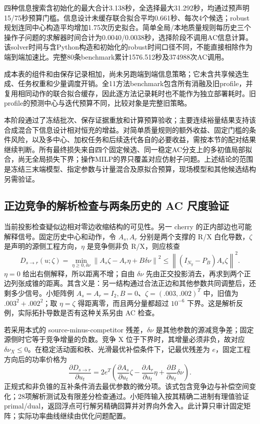 \documentclass[UTF8,fontset=fandol,11pt,a4paper]{ctexart}
\newcommand{\norm}[1]{\left\lVert#1\right\rVert}
\begin{document}
四种信息搜索含初始化的最大合计3.138秒，全选择最大31.292秒，均通过预声明15/75秒预算门槛。信息设计未缓存联合拟合平均0.661秒、每次4个候选；robust规划连同中心构造平均增加1.75次历史拟合。简单全局/本地质量规则每历史三个操作子问题的求解器时间合计为0.0040/0.0038秒，选择阶段不调用AC信息计算。该solver时间与含Python构造和初始化的robust时间口径不同，不能直接相除作为端到端加速比。完整80条benchmark累计1576.512秒及374988次AC调用。

成本表的组件和由保存记录相加，尚未另跑端到端信息策略；它未含共享候选生成、任务权重和少量调度开销。全11方法benchmark包含所有消融及旧profile，并复用相同动作的联合拟合缓存，因此逐方法记录耗时也不能作为独立部署耗时。旧profile的预测中心与迭代预算不同，比较对象是完整旧策略。

本阶段通过了冻结批次、保存证据重放和计算预算验收；主要连续裕量结果支持该合成混合下信息设计相对恒充的增益。对简单质量规则的额外收益、固定门槛的条件风险，以及多中心、加权任务和后续迭代各自的必要收益，需按本节的配对结果继续判断。所有最终损失来自四个固定候选、同一稳定AC分支上的多初值局部拟合，尚无全局损失下界；操作MILP的界只覆盖对应仿射子问题。上述结论的范围是冻结三末端模型、指定参数与计量混合及原拟合预算，现场模型和其他候选结构另需验证。

\subsection{正边竞争的解析检查与两条历史的 AC 尺度验证}
\label{si:pairwise-check}
当前投影检查疑似边相对零边收缩结构的可见性。另一 cherry 的正内部边也可能解释信号。固定历史中心和动作，令 $A_s,A_r$ 分别是两个支撑的 R/X 白化导数，$\zeta$ 是声明的源侧工程方向，$\eta$ 是竞争侧非负 R/X，则应核查
\begin{equation}
 D_{s\to r}(u;\zeta)=\min_{\eta\ge0,\delta\nu}
 \norm{A_s\zeta-A_r\eta+B\delta\nu}^2
 \le \norm{(I_{N_y}-P_B)A_s\zeta}^2.
 \label{si:pairwise-cone}
\end{equation}
$\eta=0$ 给出右侧解释，所以距离不增；自由 $\delta\nu$ 先由正交投影消去，再求到两个正边列张成锥的距离。其含义是：另一结构通过合法正边和其他参数共同调整后，还剩多少信号。小矩阵例 $A_s=A_r=I_2,B=0$、$\zeta=(.003,.002)^T$ 中，旧值为 $.003^2+.002^2$；取 $\eta=\zeta$ 得距离零，而且两分量都超过 $10^{-6}$ 下界。这是解析反例，实际拓扑导数是否有这种关系另由 AC 检查。

若采用本式的 source-minus-competitor 残差，$\delta\nu$ 是其他参数的源减竞争差；固定源侧时它等于竞争增量的负数。竞争 X 位于下界时，其增量必须非负，故对应 $\delta\nu_X\le0$。在稳定活动面和秩、光滑最优补偿条件下，记最优残差为 $e$，固定工程方向后的功率价格为
\begin{equation}
 \frac{\partial D_{s\to r}}{\partial u_t}
 =2e^T\left(\frac{\partial A_s}{\partial u_t}\zeta
 -\frac{\partial A_r}{\partial u_t}\eta
 +\frac{\partial B}{\partial u_t}\delta\nu\right).
 \label{si:pairwise-price}
\end{equation}
正规式和非负锥的互补条件消去最优参数的微分项。该式包含竞争边与补偿空间变化；28项解析测试及有限差分检查通过。小矩阵输入按其精确二进制有理值验证 primal/dual，返回浮点可行解另精确回算并对界向外舍入。此计算只审计固定矩阵；实际功率曲线继续由优化问题配置。
\end{document}
